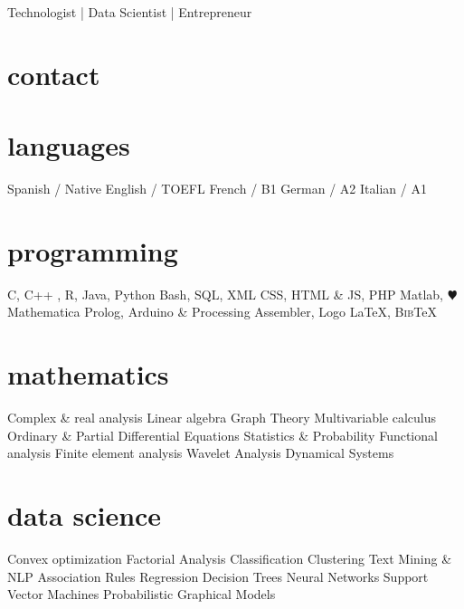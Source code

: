\documentclass[]{friggeri-cv}
\begin{document}
       {Technologist | Data Scientist | Entrepreneur}


\begin{aside}
  \section{contact} 
  \small 
  \makecvheader
  \section{languages}
    Spanish / Native
    English / TOEFL
    French / B1
    German / A2
    Italian / A1
  \section{programming}
    C, C++ , R, Java, Python
    Bash, SQL, XML
    CSS, HTML \& JS, PHP
    Matlab, {\color{red} $\varheartsuit$} Mathematica
    Prolog, %
    Arduino \& Processing
    Assembler, Logo
    \LaTeX{}, B\textsc{ib}\TeX{}
   \section{mathematics}  
   Complex \& real analysis
   Linear algebra
   Graph Theory
   Multivariable calculus
   Ordinary \& Partial Differential Equations
   Statistics \& Probability
   Functional analysis
   Finite element analysis
   Wavelet Analysis
   Dynamical Systems
   \section{data science}
   Convex optimization
   Factorial Analysis
   Classification
   Clustering
   Text Mining \& NLP
   Association Rules
   Regression
   Decision Trees
   Neural Networks
   Support Vector Machines
   Probabilistic Graphical Models
\end{aside}
\end{document}
